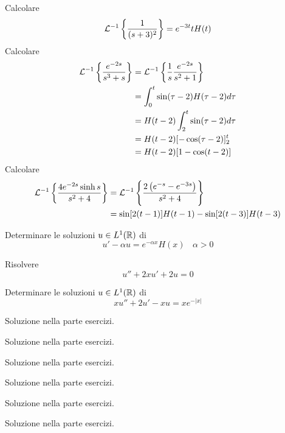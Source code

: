 Calcolare
\begin{equation*}
\mathcal{L}^{- 1}\left\{\frac{1}{(s + 3)^{2}}\right\} = e^{- 3t} tH(t)
\end{equation*}
Calcolare
\begin{equation*}
\begin{aligned}
\mathcal{L}^{- 1}\left\{\frac{e^{- 2s}}{s^{3} + s}\right\} & = \mathcal{L}^{- 1}\left\{\frac{1}{s}\frac{e^{- 2s}}{s^{2} + 1}\right\}\\
 & = \int^{t}_{0}\sin(\tau - 2) H(\tau - 2) d\tau \\
 & = H(t - 2)\int^{t}_{2}\sin(\tau - 2) d\tau \\
 & = H(t - 2)[ - \cos(\tau - 2)]^{t}_{2}\\
 & = H(t - 2)[ 1 - \cos(t - 2)]
\end{aligned}
\end{equation*}
Calcolare
\begin{equation*}
\begin{aligned}
\mathcal{L}^{- 1}\left\{\frac{4e^{- 2s}\sinh s}{s^{2} + 4}\right\} & = \mathcal{L}^{- 1}\left\{\frac{2\left(e^{- s} - e^{- 3s}\right)}{s^{2} + 4}\right\}\\
 & = \sin[ 2(t - 1)] H(t - 1) - \sin[ 2(t - 3)] H(t - 3)
\end{aligned}
\end{equation*}
\Esercizio{}

Determinare le soluzioni $u\in L^{1}(\mathbb{R})$ di
\begin{equation*}
u' - \alpha u = e^{- \alpha x} H(x) \ \ \ \ \alpha  > 0
\end{equation*}
\Esercizio{}

Risolvere
\begin{equation*}
u'' + 2xu' + 2u = 0
\end{equation*}
\Esercizio{}

Determinare le soluzioni $u\in L^{1}(\mathbb{R})$ di
\begin{equation*}
xu'' + 2u' - xu = xe^{- | x|}
\end{equation*}
\ParteSoluzioni
\Soluzione

Soluzione nella parte esercizi.
\Soluzione

Soluzione nella parte esercizi.
\Soluzione

Soluzione nella parte esercizi.
\Soluzione

Soluzione nella parte esercizi.
\Soluzione

Soluzione nella parte esercizi.
\Soluzione

Soluzione nella parte esercizi.
\Soluzione

